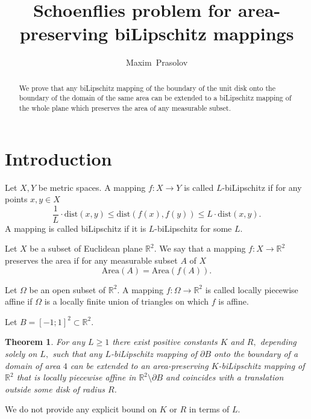 \documentclass[12pt]{article}
\newtheorem{theo}[prop]{Theorem}
\theoremstyle{definition}
\begin{document}
\title{Schoenflies problem for area-preserving biLipschitz mappings}
\author{Maxim~Prasolov}
\date{}

\maketitle

\makeatletter
\renewcommand{\@makefnmark}{}
\makeatother

\begin{abstract}
We prove that any biLipschitz mapping of the boundary of the unit disk onto the boundary of the domain of the same area can be extended to a biLipschitz mapping of the whole plane which preserves the area of any measurable subset.
\end{abstract}

\tableofcontents

\section{Introduction}

Let $X,Y$ be metric spaces. A mapping $f:X\to Y$ is called $L$-biLipschitz if for any points $x,y\in X$
$$
\frac1L\cdot\mathrm{dist}(x,y) \le \mathrm{dist}(f(x),f(y)) \le L\cdot\mathrm{dist}(x,y).
$$
A mapping is called biLipschitz if it is $L$-biLipschitz for some $L.$

Let $X$ be a subset of Euclidean plane $\mathbb R^2$. We say that a mapping $f:X\to\mathbb R^2$ preserves the area if for any measurable subset $A$ of $X$
$$
\mathrm{Area} (A) = \mathrm{Area}(f(A)).
$$

Let $\Omega$ be an open subset of $\mathbb R^2.$ A mapping $f:\Omega\to\mathbb R^2$ is called locally piecewise affine if $\Omega$ is a locally finite union of triangles on which $f$ is affine.

Let $B = [-1;1]^2\subset\mathbb R^2.$

\begin{theo}\label{main-theorem}
For any $L\ge1$ there exist positive constants $K$ and $R,$ depending solely on $L,$ such that any $L$-biLipschitz mapping of $\partial B$ onto the boundary of a domain of area $4$ can be extended to an area-preserving $K$-biLipschitz mapping of $\mathbb R^2$ that is locally piecewise affine in $\mathbb R^2\setminus\partial B$ and coincides with a translation outside some disk of radius $R$.
\end{theo}

We do not provide any explicit bound on $K$ or $R$ in terms of $L$.
\end{document}
